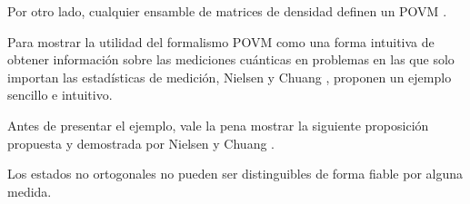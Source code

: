 Por otro lado, cualquier ensamble de matrices de densidad definen un POVM {\cite{2007geometry}}.


Para mostrar la utilidad del formalismo POVM como una forma intuitiva de obtener información sobre las mediciones cuánticas en problemas en las que solo importan las estadísticas de medición, Nielsen y Chuang {\cite{nielsen_chuang_2010}}, proponen un ejemplo sencillo e intuitivo.

Antes de presentar el ejemplo, vale la pena mostrar la siguiente proposición propuesta y demostrada por Nielsen y Chuang {\cite{nielsen_chuang_2010}}.

\begin{proposition}Los estados no ortogonales no pueden ser distinguibles de forma fiable por alguna medida.
\end{proposition}

